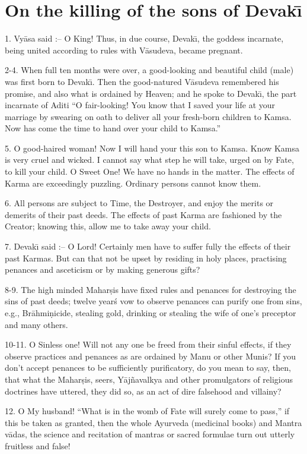 \chapter{On the killing of the sons of Devak\={\i}}

1. Vy\=asa said :-- O King! Thus, in due course, Devak\={\i}, the goddess incarnate, being united according to rules with V\=asudeva, became pregnant.

2-4. When full ten months were over, a good-looking and beautiful child (male) was first born to Devak\={\i}. Then the good-natured V\=asudeva remembered his promise, and also what is ordained by Heaven; and he spoke to Devak\={\i}, the part incarnate of Aditi ``O fair-looking! You know that I saved your life at your marriage by swearing on oath to deliver all your fresh-born children to Kamsa. Now has come the time to hand over your child to Kamsa.''

5. O good-haired woman! Now I will hand your this son to Kamsa. Know Kamsa is very cruel and wicked. I cannot say what step he will take, urged on by Fate, to kill your child. O Sweet One! We have no hands in the matter. The effects of Karma are exceedingly puzzling. Ordinary persons cannot know them.

6. All persons are subject to Time, the Destroyer, and enjoy the merits or demerits of their past deeds. The effects of past Karma are fashioned by the Creator; knowing this, allow me to take away your child.

7. Devak\={\i} said :-- O Lord! Certainly men have to suffer fully the effects of their past Karmas. But can that not be upset by residing in holy places, practising penances and asceticism or by making generous gifts?

8-9. The high minded Mahar\d{s}is have fixed rules and penances for destroying the sins of past deeds; twelve year\'s vow to observe penances can purify one from sins, e.g., Br\=ahmi\d{n}icide, stealing gold, drinking or stealing the wife of one's preceptor and many others.

10-11. O Sinless one! Will not any one be freed from their sinful effects, if they observe practices and penances as are ordained by Manu or other Munis? If you don't accept penances to be sufficiently purificatory, do you mean to say, then, that what the Mahar\d{s}is, seers, Y\=aj\~navalkya and other promulgators of religious doctrines have uttered, they did so, as an act of dire falsehood and villainy?

12. O My husband! ``What is in the womb of Fate will surely come to pass,'' if this be taken as granted, then the whole Ayurveda (medicinal books) and Mantra v\=adas, the science and recitation of mantras or sacred formulae turn out utterly fruitless and false!

